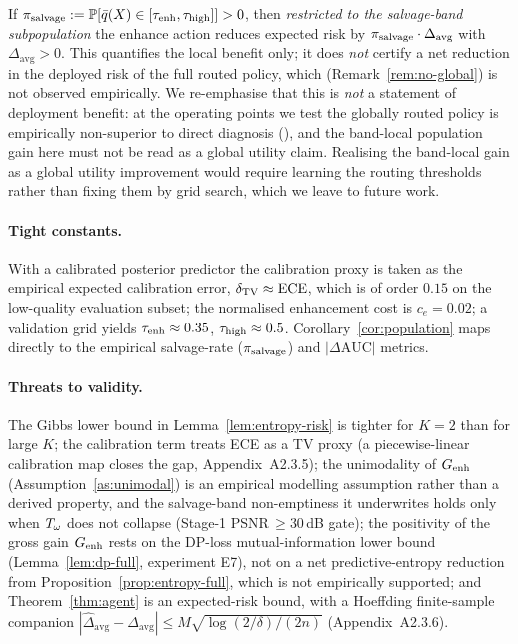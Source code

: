 \begin{corollary}\label{cor:population}
If $\pi_{\mathrm{salvage}} := \mathbb{P}[\bar{q}(X)\in[\tau_{\mathrm{enh}},\tau_{\mathrm{high}}]] > 0$, then \emph{restricted to the
salvage-band subpopulation} the enhance action reduces expected risk by
$\pi_{\mathrm{salvage}}\cdot\Delta_{\mathrm{avg}}$ with $\Delta_{\mathrm{avg}}>0$. This quantifies the local
benefit only; it does \emph{not} certify a net reduction in the deployed risk of the full routed
policy, which (Remark~\ref{rem:no-global}) is not observed empirically. We re-emphasise that this
is \emph{not} a statement of deployment benefit: at the operating points we test the globally
routed policy is empirically non-superior to direct diagnosis (), and the
band-local population gain here must not be read as a global utility claim. Realising the
band-local gain as a global utility improvement would require learning the routing thresholds
rather than fixing them by grid search, which we leave to future work.
\end{corollary}

\paragraph{Tight constants.}
With a calibrated posterior predictor the calibration proxy is taken as the empirical expected
calibration error, $\delta_{\mathrm{TV}}\approx\operatorname{ECE}$, which is of order $0.15$ on the low-quality
evaluation subset;%
the normalised enhancement cost is $c_e=0.02$; a validation grid yields
$\tau_{\mathrm{enh}}\approx 0.35$, $\tau_{\mathrm{high}}\approx 0.5$. Corollary~\ref{cor:population} maps directly to
the empirical salvage-rate ($\pi_{\mathrm{salvage}}$) and $|\Delta\mathrm{AUC}|$ metrics.

\paragraph{Threats to validity.}
The Gibbs lower bound in Lemma~\ref{lem:entropy-risk} is tighter for $K=2$ than for large $K$;
the calibration term treats ECE as a TV proxy (a piecewise-linear calibration map closes the
gap, Appendix~A2.3.5); the unimodality of $G_{\mathrm{enh}}$ (Assumption~\ref{as:unimodal}) is an empirical
modelling assumption rather than a derived property, and the salvage-band non-emptiness it
underwrites holds only when $T_\omega$ does not collapse (Stage-1 PSNR$\,\geq 30$\,dB gate); the
positivity of the gross gain $G_{\mathrm{enh}}$ rests on the DP-loss mutual-information lower bound
(Lemma~\ref{lem:dp-full}, experiment E7), not on a net predictive-entropy reduction from
Proposition~\ref{prop:entropy-full}, which is not empirically supported; and
Theorem~\ref{thm:agent} is an expected-risk bound, with a Hoeffding finite-sample companion
$|\hat{\Delta}_{\mathrm{avg}}-\Delta_{\mathrm{avg}}|\leq M\sqrt{\log(2/\delta)/(2n)}$
(Appendix~A2.3.6).
